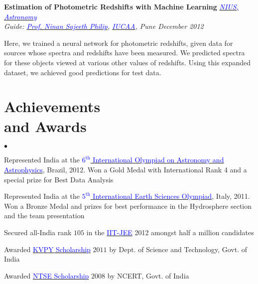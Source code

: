 \documentclass[margin,line]{res}
\newenvironment{list1}{
  \begin{list}{\ding{113}}{%
      \setlength{\itemsep}{0in}
      \setlength{\parsep}{0in} \setlength{\parskip}{0in}
      \setlength{\topsep}{0in} \setlength{\partopsep}{0in} 
      \setlength{\leftmargin}{0.17in}}}{\end{list}}
\newenvironment{list2}{
  \begin{list}{$\bullet$}{%
      \setlength{\itemsep}{0in}
      \setlength{\parsep}{0in} \setlength{\parskip}{0in}
      \setlength{\topsep}{0in} \setlength{\partopsep}{0in} 
      \setlength{\leftmargin}{0.2in}}}{\end{list}}
\begin{document}
\begin{resume}
{\bf Estimation of Photometric Redshifts with Machine Learning} \hfill \textit{\href{http://nius.hbcse.tifr.res.in/}{\textcolor{blue} {NIUS, Astronomy}}} \\
{\em Guide: \href{http://www.iucaa.ernet.in/~nspp/}{\textcolor{blue}{Prof. Ninan Sajeeth Philip}}, \href{http://www.iucaa.ernet.in/}{\textcolor{blue} {IUCAA}}, Pune \hfill December 2012} \\
\vspace*{-.15in}
\begin{list1}
\item[] Here, we trained a neural network for photometric redshifts, given data for sources whose spectra and redshifts have been measured. We predicted spectra for these objects viewed at various other values of redshifts. Using this expanded dataset, we achieved good predictions for test data.
\end{list1}

\section{\sc Achievements \\ and Awards}
\begin{list2}
\item Represented India at the \href{http://www.ioaa2012.ufrj.br/}{\textcolor{blue} {$6^\text{th}$ International Olympiad on Astronomy and Astrophysics}}, Brazil, 2012. Won a Gold Medal with International Rank 4 and a special prize for Best Data Analysis
\item Represented India at the \href{http://www.ieso2011.unimore.it/}{\textcolor{blue} {$5^\text{th}$ International Earth Sciences Olympiad}}, Italy, 2011. Won a Bronze Medal and prizes for best performance in the Hydrosphere section and the team presentation
\item  Secured all-India rank $105$ in the \href{https://en.wikipedia.org/wiki/Indian_Institute_of_Technology_Joint_Entrance_Examination}{\textcolor{blue}{IIT-JEE}} 2012 amongst half a million candidates
\item Awarded \href{http://www.kvpy.iisc.ernet.in/main/index.htm}{\textcolor{blue}{KVPY Scholarship}} $2011$ by Dept. of Science and Technology, Govt. of India
\item Awarded \href{http://www.ncert.nic.in/programmes/talent_exam/index_talent.html}{\textcolor{blue}{NTSE Scholarship}} $2008$ by NCERT, Govt. of India
\end{list2}


\end{resume}
\end{document}
